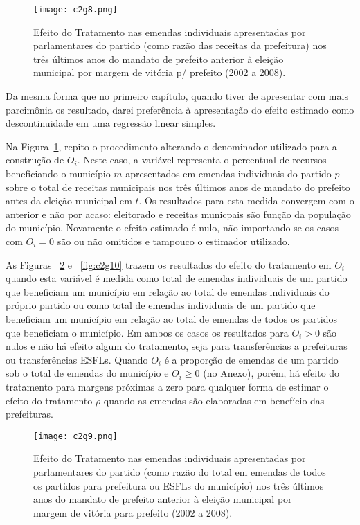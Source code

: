 \begin{figure}[htp]
	\centering
	\texttt{[image: c2g8.png]}
	\caption{Efeito do Tratamento nas emendas individuais apresentadas por parlamentares do partido (como razão das receitas da prefeitura) nos três últimos anos do mandato de prefeito anterior à eleição municipal por margem de vitória p/ prefeito (2002 a 2008).}
	\label{fig:c2g8}
\end{figure}

Da mesma forma que no primeiro capítulo, quando tiver de apresentar com mais parcimônia os resultado, darei preferência à apresentação do efeito estimado como descontinuidade em uma regressão linear simples.

Na Figura~\ref{fig:c2g8}, repito o procedimento alterando o denominador utilizado para a construção de $O_{i}$. Neste caso, a variável representa o percentual de recursos beneficiando o município $m$ apresentados em emendas individuais do partido $p$ sobre o total de receitas municipais nos três últimos anos de mandato do prefeito antes da eleição municipal em $t$. Os resultados para esta medida convergem com o anterior e não por acaso: eleitorado e receitas municpais são função da população do município. Novamente o efeito estimado é nulo, não importando se os casos com $O_{i}=0$ são ou não omitidos e tampouco o estimador utilizado.

As Figuras ~\ref{fig:c2g9} e ~\ref{fig:c2g10} trazem os resultados do efeito do tratamento em $O_{i}$ quando esta variável é medida como total de emendas individuais de um partido que beneficiam um município em relação ao total de emendas individuais do próprio partido ou como total de emendas individuais de um partido que beneficiam um município em relação ao total de emendas de todos os partidos que beneficiam o município. Em ambos os casos os resultados para $O_{i}>0$ são nulos e não há efeito algum do tratamento, seja para transferências a prefeituras ou transferências ESFLs. Quando $O_{i}$ é a proporção de emendas de um partido sob o total de emendas do município e $O_{i} \geq 0$ (no Anexo), porém, há efeito do tratamento para margens próximas a zero para qualquer forma de estimar o efeito do tratamento $\rho$ quando as emendas são elaboradas em benefício das prefeituras.

\begin{figure}[htp]
	\centering
	\texttt{[image: c2g9.png]}
	\caption{Efeito do Tratamento nas emendas individuais apresentadas por parlamentares do partido (como razão do total em emendas de todos os partidos para prefeitura ou ESFLs do município) nos três últimos anos do mandato de prefeito anterior à eleição municipal por margem de vitória para prefeito (2002 a 2008).}
	\label{fig:c2g9}
\end{figure}

